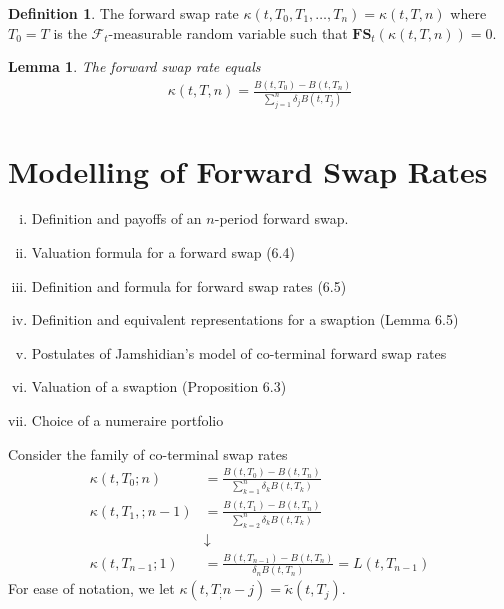 \documentclass[10pt, oneside, reqno]{amsbook}
\theoremstyle{plain}%
\newtheorem{lem}[thm]{Lemma}
\theoremstyle{definition}
\newtheorem{defn}[thm]{Definition}
\theoremstyle{remark}
\newcommand{\sigf}{\mathcal{F}}
\numberwithin{equation}{chapter}
\begin{document}


\begin{defn}
	The forward swap rate $\kappa(t, T_0, T_1, \dots, T_n) = \kappa(t, T, n)$ where $T_0 = T$ is the $\sigf_t$-measurable random variable such that $\mathbf{FS}_t \left( \kappa(t, T, n) \right) = 0$.  
\end{defn}

\begin{lem}
	The forward swap rate equals \begin{align*}
		\kappa(t, T, n) = \frac{B(t, T_0) - B(t, T_n)}{\sum_{j=1}^n \delta_j B(t, T_j)}
	\end{align*}
\end{lem}

\chapter{Modelling of Forward Swap Rates} %
\label{cha:modelling_of_forward_swap_rates}
\begin{enumerate}[(i)]
	\item Definition and payoffs of an $n$-period forward swap.
	\item Valuation formula for a forward swap (6.4)
	\item Definition and formula for forward swap rates (6.5)
	\item Definition and equivalent representations for a swaption (Lemma 6.5)
	\item Postulates of Jamshidian's model of co-terminal forward swap rates
	\item Valuation of a swaption (Proposition 6.3)
	\item Choice of a numeraire portfolio
\end{enumerate}

Consider the family of co-terminal swap rates \begin{align*}
	\kappa(t, T_0; n) &= \frac{B(t, T_0) - B(t, T_n)}{\sum_{k=1}^n \delta_k B(t, T_k)} \\
	\kappa(t, T_1,; n-1) &= \frac{B(t, T_1) - B(t, T_n)}{\sum_{k=2}^n \delta_k B(t, T_k)} \\
	&\downarrow \\
	\kappa(t, T_{n-1}; 1) &= \frac{B(t, T_{n-1}) - B(t, T_n)}{\delta_n B(t, T_n)} = L(t, T_{n-1}) 
\end{align*}  For ease of notation, we let $\kappa(t, T_; n-j) = \tilde \kappa(t, T_j)$.
\end{document}
